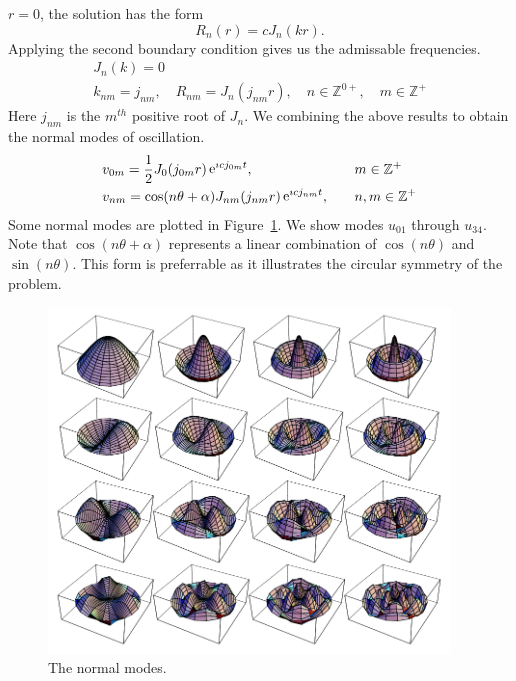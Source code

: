 {\begin{Solution}
  $r = 0$, the solution has the form
  \[
  R_n(r) = c J_n(k r).
  \]
  Applying the second boundary condition gives us the admissable frequencies.
  \begin{gather*}
    J_n(k) = 0
    \\
    k_{nm} = j_{nm}, \quad R_{nm} = J_n(j_{nm} r), 
    \quad n \in \mathbb{Z}^{0+}, \quad m \in \mathbb{Z}^+
  \end{gather*}
  Here $j_{nm}$ is the $m^{th}$ positive root of $J_n$.
  We combining the above results to obtain the normal modes of oscillation.
  \begin{alignat*}{2}
    &v_{0m} = \frac{1}{2} J_0(j_{0m} r) \mathop{\mathrm{e}}\nolimits^{\imath c j_{0 m} t}, &\quad &m \in \mathbb{Z}^+
    \\
    &v_{nm} = \cos(n \theta + \alpha) J_{nm}(j_{nm} r) \mathop{\mathrm{e}}\nolimits^{\imath c j_{n m} t}, 
    &\quad &n,m \in \mathbb{Z}^+
  \end{alignat*}
  Some normal modes are plotted in Figure~\ref{normalmode0134}.
  We show modes $u_{01}$ through $u_{34}$.
  Note that $\cos(n \theta + \alpha)$ represents a linear combination of $\cos(n \theta)$ and
  $\sin(n \theta)$.  This form is preferrable as it illustrates the circular 
  symmetry of the problem.

  \begin{figure}[h!]
    \begin{center}
      \includegraphics[width=0.95\textwidth]{pde/separation/normalmode0134}
    \end{center}
    \caption{The normal modes.}
    \label{normalmode0134}
  \end{figure}


\end{Solution}}
